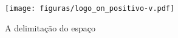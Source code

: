 \begin{figure}[htb]
    \caption{\label{fig_circulo}A delimitação do espaço}
    \begin{center}
    \texttt{[image: figuras/logo\_on\_positivo-v.pdf]}
    \end{center}
\end{figure}
